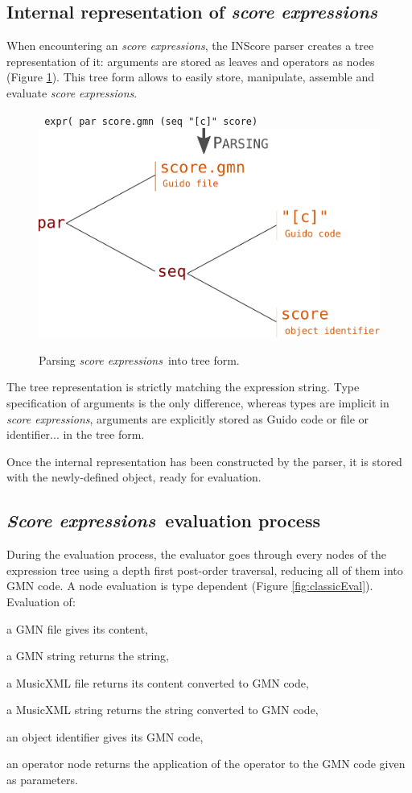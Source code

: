 \documentclass{article}
\newcommand{\OSC}[1]{\texttt{#1}}
\newcommand{\oper}[1]{\textcolor{figRed}{#1}}
\newcommand{\param}[1]{\textcolor{figOrange}{#1}}
\newcommand{\sExpr}{\emph{score expressions}}
\newcommand{\SExpr}{\emph{Score expressions}}
\let\olditemize\itemize
\let\oldenditemize\enditemize
\renewenvironment{itemize} 	{\olditemize \setlength{\itemsep}{1mm}}{\oldenditemize}
\begin{document}
\subsection{Internal representation of \sExpr}

When encountering an \sExpr, the INScore parser creates a tree representation of it: arguments are stored as leaves and operators as nodes (Figure \ref{fig:parsing}). This tree form allows to easily  store, manipulate, assemble and evaluate \sExpr.

\begin{figure}[th]
\centering
\OSC{ expr( \oper{par} \param{score.gmn}  (\oper{seq} \param{"[c]" score})}
\includegraphics[width=0.8\columnwidth]{imgs/exprParse}
\caption{Parsing \sExpr\ into tree form.
\label{fig:parsing}}
\end{figure}

The tree representation is strictly matching the expression string. Type specification of arguments is the only difference, whereas types are implicit in \sExpr, arguments are explicitly stored as Guido code or file or identifier... in the tree form. 

Once the internal representation has been constructed by the parser, it is stored with the newly-defined object, ready for evaluation.

\subsection{\SExpr\ evaluation process}
During the evaluation process, the evaluator goes through every nodes of the expression tree using a depth first post-order traversal, reducing all of them into GMN code.
A node evaluation is type dependent (Figure \ref{fig:classicEval}). \\
Evaluation of:  
\begin{itemize}
\item a GMN file gives its content,
\item a GMN string returns the string,
\item a MusicXML file returns its content converted to GMN code,
\item a MusicXML string returns the string converted to GMN code,
\item an object identifier gives its GMN code,
\item an operator node returns the application of the operator to the GMN code given as parameters.
\end{itemize}
\end{document}
